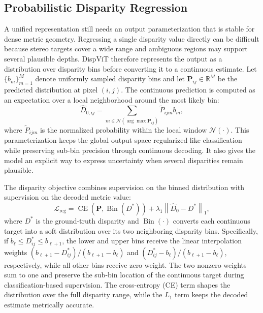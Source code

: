 \subsection{Probabilistic Disparity Regression}
\label{sec:dispvit_prob}
A unified representation still needs an output parameterization that is stable for dense metric geometry.
Regressing a single disparity value directly can be difficult because stereo targets cover a wide range and ambiguous regions may support several plausible depths.
DispViT therefore represents the output as a distribution over disparity bins before converting it to a continuous estimate.
Let $\{b_m\}_{m=1}^{M}$ denote uniformly sampled disparity bins and let $\bm{P}_{ij}\in\mathbb{R}^{M}$ be the predicted distribution at pixel $(i,j)$.
The continuous prediction is computed as an expectation over a local neighborhood around the most likely bin:
\begin{equation}
    \hat{D}_{0,ij} = \sum_{m \in \mathcal{N}(\arg\max \bm{P}_{ij})} \tilde{P}_{ijm} b_m ,
    \label{eq:dispvit_expectation}
\end{equation}
where $\tilde{P}_{ijm}$ is the normalized probability within the local window $\mathcal{N}(\cdot)$.
This parameterization keeps the global output space regularized like classification while preserving sub-bin precision through continuous decoding.
It also gives the model an explicit way to express uncertainty when several disparities remain plausible.

The disparity objective combines supervision on the binned distribution with supervision on the decoded metric value:
\begin{equation}
    \mathcal{L}_{\mathrm{reg}}
    =
    \operatorname{CE}\!\left(\bm{P},\operatorname{Bin}(D^{\ast})\right)
    +
    \lambda_1
    \left\lVert \hat{D}_0 - D^{\ast}\right\rVert_1 ,
    \label{eq:dispvit_loss}
\end{equation}
where $D^{\ast}$ is the ground-truth disparity and $\operatorname{Bin}(\cdot)$ converts each continuous target into a soft distribution over its two neighboring disparity bins.
Specifically, if $b_{\ell} \leq D^{\ast}_{ij} \leq b_{\ell+1}$, the lower and upper bins receive the linear interpolation weights $(b_{\ell+1}-D^{\ast}_{ij})/(b_{\ell+1}-b_{\ell})$ and $(D^{\ast}_{ij}-b_{\ell})/(b_{\ell+1}-b_{\ell})$, respectively, while all other bins receive zero weight.
The two nonzero weights sum to one and preserve the sub-bin location of the continuous target during classification-based supervision.
The cross-entropy (CE) term shapes the distribution over the full disparity range, while the $L_1$ term keeps the decoded estimate metrically accurate.

